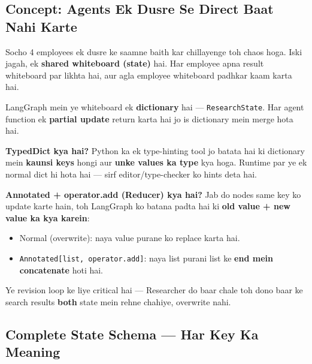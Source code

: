 \documentclass[11pt, a4paper]{article}
\begin{document}
\subsection{Concept: Agents Ek Dusre Se Direct Baat Nahi Karte}

\begin{storybox}
Socho 4 employees ek dusre ke saamne baith kar chillayenge toh chaos hoga. Iski jagah, ek \textbf{shared whiteboard (state)} hai. Har employee apna result whiteboard par likhta hai, aur agla employee whiteboard padhkar kaam karta hai.

LangGraph mein ye whiteboard ek \textbf{dictionary} hai --- \texttt{ResearchState}. Har agent function ek \textbf{partial update} return karta hai jo is dictionary mein merge hota hai.
\end{storybox}

\begin{conceptbox}
\textbf{TypedDict kya hai?} Python ka ek type-hinting tool jo batata hai ki dictionary mein \textbf{kaunsi keys} hongi aur \textbf{unke values ka type} kya hoga. Runtime par ye ek normal dict hi hota hai --- sirf editor/type-checker ko hints deta hai.

\textbf{Annotated + operator.add (Reducer) kya hai?} Jab do nodes same key ko update karte hain, toh LangGraph ko batana padta hai ki \textbf{old value + new value ka kya karein}:
\begin{itemize}
\item Normal (overwrite): naya value purane ko replace karta hai.
\item \texttt{Annotated[list, operator.add]}: naya list purani list ke \textbf{end mein concatenate} hoti hai.
\end{itemize}
Ye revision loop ke liye critical hai --- Researcher do baar chale toh dono baar ke search results \textbf{both} state mein rehne chahiye, overwrite nahi.
\end{conceptbox}

\subsection{Complete State Schema --- Har Key Ka Meaning}
\end{document}
